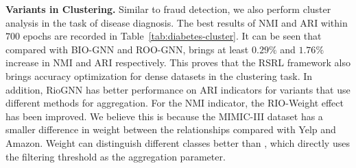 \begin{table}[h]
    \setlength{\abovecaptionskip}{0.cm}
    \setlength{\belowcaptionskip}{-0.cm}
    \caption{Diabetes diagnosis clustering results ($\%$) compared to \RioGNN variants.}\label{tab:diabetes-cluster}
    \centering
\end{table}

\textbf{\RioGNN Variants in Clustering. }
Similar to fraud detection, we also perform cluster analysis in the task of disease diagnosis. 
The best results of NMI and ARI within $700$ epochs are recorded in Table~\ref{tab:diabetes-cluster}. 
It can be seen that compared with BIO-GNN and ROO-GNN, \RioGNN brings at least $0.29\%$ and $1.76\%$ increase in NMI and ARI respectively. 
This proves that the RSRL framework also brings accuracy optimization for dense datasets in the clustering task. 
In addition, RioGNN has better performance on ARI indicators for variants that use different methods for aggregation. 
For the NMI indicator, the RIO-Weight effect has been improved. 
We believe this is because the MIMIC-III dataset has a smaller difference in weight between the relationships compared with Yelp and Amazon. 
Weight can distinguish different classes better than \RioGNN, which directly uses the filtering threshold as the aggregation parameter.



